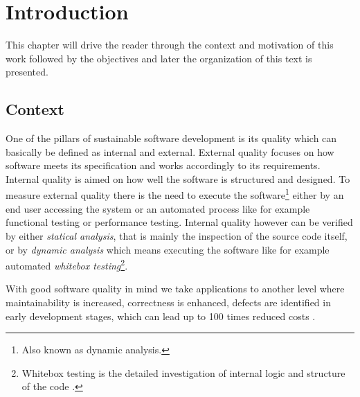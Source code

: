 \chapter{Introduction}
 This chapter will drive the reader through the context and motivation of this work followed by the objectives and later the organization of this text is presented.  
 

\section{Context}

One of the pillars of sustainable software development is its quality which can basically be defined as internal and external. External quality focuses on how software meets its specification and works accordingly to its requirements. Internal quality is aimed on how well the software is structured and designed. To measure external quality there is the need to execute the software\footnote{Also known as dynamic analysis.} either by an end user accessing the system or an automated process like for example functional testing or performance testing. Internal quality however can be verified by either \emph{statical analysis}, that is mainly the inspection of the source code itself, or by \emph{dynamic analysis} which means executing the software like for example automated \emph{whitebox testing}\footnote{Whitebox testing is the detailed investigation of internal logic and structure of the code \citep{Khan 2012}.}.   

With good software quality in mind we take applications to another level where maintainability is increased, correctness is enhanced, defects are identified in early development stages, which can lead up to 100 times reduced costs \citep{Beohm 2001}.

